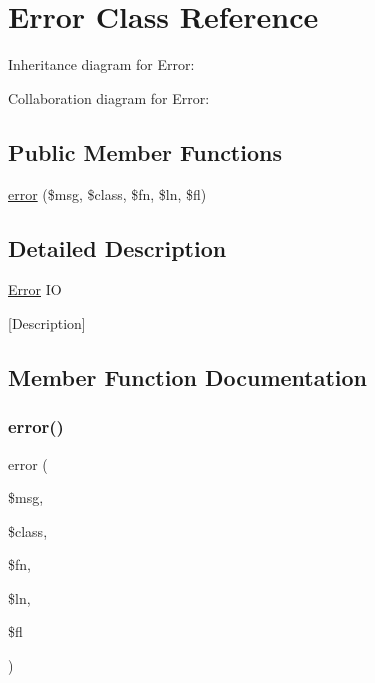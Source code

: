 \hypertarget{class_w_a_f_f_l_e_1_1_framework_1_1_i_o_1_1_error}{}\section{Error Class Reference}
\label{class_w_a_f_f_l_e_1_1_framework_1_1_i_o_1_1_error}


Inheritance diagram for Error\+:


Collaboration diagram for Error\+:
\subsection*{Public Member Functions}
\begin{DoxyCompactItemize}
\item 
\hyperlink{class_w_a_f_f_l_e_1_1_framework_1_1_i_o_1_1_error_af721dfe2b0cca44a3c68c6fda1439165}{error} (\$msg, \$class, \$fn, \$ln, \$fl)
\end{DoxyCompactItemize}


\subsection{Detailed Description}
\hyperlink{class_w_a_f_f_l_e_1_1_framework_1_1_i_o_1_1_error}{Error} IO

\mbox{[}Description\mbox{]} 

\subsection{Member Function Documentation}
\mbox{\label{class_w_a_f_f_l_e_1_1_framework_1_1_i_o_1_1_error_af721dfe2b0cca44a3c68c6fda1439165}} 
\subsubsection{\texorpdfstring{error()}{error()}}
{\footnotesize\ttfamily error (\begin{DoxyParamCaption}\item[{}]{\$msg,  }\item[{}]{\$class,  }\item[{}]{\$fn,  }\item[{}]{\$ln,  }\item[{}]{\$fl }\end{DoxyParamCaption})}

